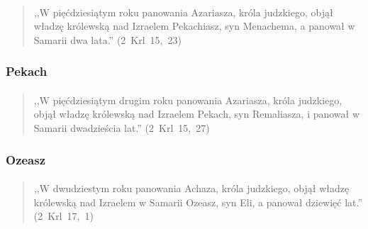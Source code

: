 \documentclass[10pt,a4paper,oneside]{article}
\begin{document}
\paragraph{}
\begin{quote}
,,W pięćdziesiątym roku panowania Azariasza, króla judzkiego, objął władzę królewską nad Izraelem Pekachiasz, syn Menachema, a panował w Samarii dwa lata.'' \mbox{(2 Krl 15, 23)}
\end{quote}
\subsubsection{Pekach}
\paragraph{}
\begin{quote}
,,W pięćdziesiątym drugim roku panowania Azariasza, króla judzkiego, objął władzę królewską nad Izraelem Pekach, syn Remaliasza, i panował w Samarii dwadzieścia lat.'' \mbox{(2 Krl 15, 27)}
\end{quote}
\subsubsection{Ozeasz}
\paragraph{}
\begin{quote}
,,W dwudziestym roku panowania Achaza, króla judzkiego, objął władzę królewską nad Izraelem w Samarii Ozeasz, syn Eli, a panował dziewięć lat.'' \mbox{(2 Krl 17, 1)}
\end{quote}
\end{document}
